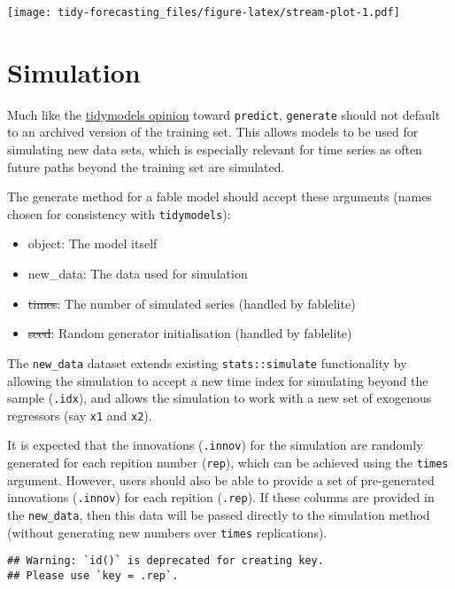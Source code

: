 \documentclass[]{book}
\providecommand{\tightlist}{%
  \setlength{\itemsep}{0pt}\setlength{\parskip}{0pt}}
\begin{document}
\texttt{[image: tidy-forecasting\_files/figure-latex/stream-plot-1.pdf]}

\hypertarget{simulation}{%
\section{Simulation}\label{simulation}}

Much like the \href{https://tidymodels.github.io/model-implementation-principles/model-predictions.html\#input-data}{tidymodels opinion} toward \texttt{predict}, \texttt{generate} should not default to an archived version of the training set. This allows models to be used for simulating new data sets, which is especially relevant for time series as often future paths beyond the training set are simulated.

The generate method for a fable model should accept these arguments (names chosen for consistency with \texttt{tidymodels}):

\begin{itemize}
\tightlist
\item
  object: The model itself
\item
  new\_data: The data used for simulation
\item
  \sout{times}: The number of simulated series (handled by fablelite)
\item
  \sout{seed}: Random generator initialisation (handled by fablelite)
\end{itemize}

The \texttt{new\_data} dataset extends existing \texttt{stats::simulate} functionality by allowing the simulation to accept a new time index for simulating beyond the sample (\texttt{.idx}), and allows the simulation to work with a new set of exogenous regressors (say \texttt{x1} and \texttt{x2}).

It is expected that the innovations (\texttt{.innov}) for the simulation are randomly generated for each repition number (\texttt{rep}), which can be achieved using the \texttt{times} argument. However, users should also be able to provide a set of pre-generated innovations (\texttt{.innov}) for each repition (\texttt{.rep}). If these columns are provided in the \texttt{new\_data}, then this data will be passed directly to the simulation method (without generating new numbers over \texttt{times} replications).

\begin{verbatim}
## Warning: `id()` is deprecated for creating key.
## Please use `key = .rep`.
\end{verbatim}
\end{document}
